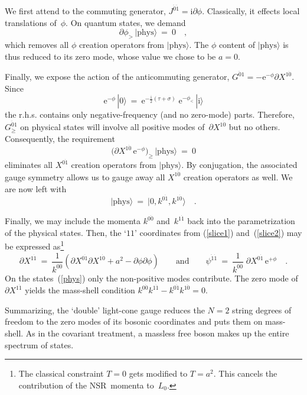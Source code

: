 \documentclass[a4paper,11pt]{article}
\def\s{\sigma}
\def\t{\tau}
\def\j{\psi}
\def\e{\textrm{e}}
\def\i{\textrm{i}}
\def\N2{$N{=}2$}
\def\pa{\mbox{$\partial$}}
\def\sfrac#1#2{{\textstyle\frac{#1}{#2}}}
\def\zd{{\dot{0}}}
\def\od{{\dot{1}}}
\def\zdd{{\ddot{0}}}
\def\odd{{\ddot{1}}}
\def\kinv{\sfrac{1}{k^{0\zd}}}
\begin{document}
We first attend to the commuting generator, $J^{\zdd\odd}=\i\pa\phi$.
Classically, it effects local translations of~$\phi$.
On quantum states, we demand
\begin{equation}
\pa\phi_>\,|\textrm{phys}\rangle\ =\ 0 \quad,
\end{equation}
which removes all $\phi$ creation operators from $|\textrm{phys}\rangle$.
The $\phi$ content of $|\textrm{phys}\rangle$ is thus reduced to its zero mode,
whose value we chose to be $a{=}0$.

Finally, we expose the action of the anticommuting generator, 
$G^{\zdd 1}=-\e^{-\phi}\pa X^{1\zd}$. Since 
\begin{equation} \label{nozero}
\e^{-\phi}\,|0\rangle\ =\ 
\e^{-\frac{\i}{2}(\t+\s)}\;\e^{-\phi_<}\,|\i\rangle
\end{equation}
the r.h.s. contains only negative-frequency (and no zero-mode) parts.
Therefore,
$G_\ge^{\zdd 1}$ on physical states will involve all positive modes
of~$\pa X^{1\zd}$ but no others. Consequently, the requirement
\begin{equation}
\bigl( \pa X^{1\zd}\,\e^{-\phi} \bigr)_\ge\,|\textrm{phys}\rangle\ =\ 0
\end{equation}
eliminates all $X^{0\od}$ creation operators from $|\textrm{phys}\rangle$.
By conjugation, the associated gauge symmetry allows us to gauge away all
$X^{1\zd}$ creation operators as well.
We are now left with 
\begin{equation} \label{phys}
|\textrm{phys}\rangle\ =\ |0,k^{0\od},k^{1\zd}\rangle \quad.
\end{equation}

Finally, we may include the momenta $k^{0\zd}$ and~$k^{1\od}$ back into
the parametrization of the physical states.
Then, the `$11$' coordinates from
(\ref{slice1}) and~(\ref{slice2}) may be expressed as\footnote{
The classical constraint $T{=}0$ gets modified to $T{=}a^2$.
This cancels the contribution of the NSR~momenta to~$L_0$.}
\begin{equation}
\pa X^{1\od}\ =\ \kinv ( \pa X^{0\od} \pa X^{1\zd} + a^2 - \pa\phi\pa\phi )
\qquad\textrm{and}\qquad
\j^{\odd\od}\ =\ \kinv\;\pa X^{0\od}\,\e^{+\phi} \quad.
\end{equation}
On the states~(\ref{phys}) only the non-positive modes contribute.
The zero mode of $\pa X^{1\od}$ yields the mass-shell condition
$k^{0\zd}k^{1\od}-k^{0\od}k^{1\zd}=0$.

Summarizing, the `double' light-cone gauge reduces the \N2 string
degrees of freedom to the zero modes of its bosonic coordinates
and puts them on mass-shell. As in the covariant treatment, 
a massless free boson makes up the entire spectrum of states.
\end{document}
